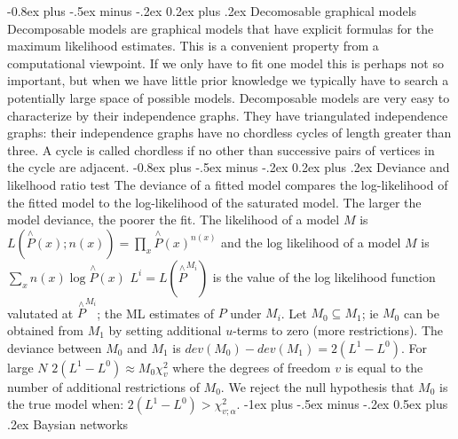 \documentclass[8pt,landscape]{extarticle}
\makeatletter
\renewcommand{\section}{\@startsection{section}{1}{0mm}%
                                {-1ex plus -.5ex minus -.2ex}%
                                {0.5ex plus .2ex}%
                                {\normalfont\large\bfseries}}
\renewcommand{\subsection}{\@startsection{subsection}{2}{0mm}%
                                {-0.8ex plus -.5ex minus -.2ex}%
                                {0.2ex plus .2ex}%
                                {\normalfont\normalsize\bfseries}}
\makeatother
\begin{document}
\begin{multicols}{3}
\subsection{Decomosable graphical models}
Decomposable models are graphical models that have explicit formulas for the
maximum likelihood estimates.
This is a convenient property from a computational viewpoint.
If we only have to fit one model this is perhaps not so important,
but when we have little prior knowledge we typically have to search a
potentially large space of possible models.
Decomposable models are very easy to characterize by their independence graphs.
They have triangulated independence graphs: their independence graphs have no
chordless cycles of length greater than three. A cycle is called chordless
if no other than successive pairs of vertices in the cycle are adjacent. 
\subsection{Deviance and likelhood ratio test}
The deviance of a fitted model compares the log-likelihood of the fitted model
to the log-likelihood of the saturated model.
The larger the model deviance, the poorer the fit.
The likelihood of a model $M$ is
$L(\overset{\wedge}{P}(x);n(x))=\underset{x}{\prod}\overset{\wedge}{P}(x)^{n(x)}$
and the log likelihood of a model $M$ is
$\underset{x}{\sum} n(x)\log \overset{\wedge}{P}(x)$
$L^i=L(\overset{\wedge}{P}^{M_i})$ is the value of the log likelihood function
valutated at $\overset{\wedge}{P}^{M_i}$; the ML estimates of $P$ under $M_i$.
Let $M_0 \subseteq M_1$; ie $M_0$ can be obtained from $M_1$ by setting
additional $u$-terms to zero (more restrictions). The deviance between $M_0$ and
$M_1$ is $dev(M_0) - dev(M_1) = 2(L^1 - L^0)$.
For large $N$ $2(L^1-L^0) \approx M_0 \chi^2_v$ where the degrees of freedom $v$
is equal to the number of additional restrictions of $M_0$. 
We reject the null hypothesis that $M_0$ is the true model when:
$2(L^1-L^0)>\chi^2_{v;\alpha}$. 
\section{Baysian networks}

\end{multicols}
\end{document}
